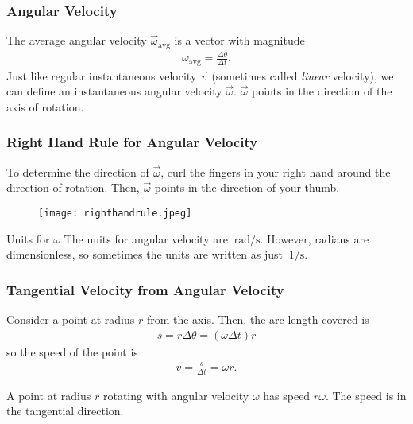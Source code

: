 \documentclass[20pt]{beamer}
\begin{document}
\begin{frame}
	\frametitle{Angular Velocity}
	\begin{definition}
		The average angular velocity $\vec{\omega}_\mathrm{avg}$ is a vector with magnitude
		\begin{align*}
			\omega_\mathrm{avg} = \frac{\Delta \theta}{\Delta t}.
		\end{align*}
		Just like regular instantaneous velocity $\vec{v}$ (sometimes called \textit{linear} velocity), we can define an instantaneous angular velocity $\vec{\omega}$.
		$\vec{\omega}$ points in the direction of the axis of rotation.
	\end{definition}
	\begin{figure}[ht]
		\centering
		\label{fig:angularvel}
	\end{figure}
\end{frame}

\begin{frame}
	\frametitle{Right Hand Rule for Angular Velocity}
	\begin{theorem}
		To determine the direction of $\vec{\omega}$, curl the fingers in your right hand around the direction of rotation. Then, $\vec{\omega}$ points in the direction of your thumb.
	\end{theorem}
	\begin{figure}[ht]
		\centering
		\texttt{[image: righthandrule.jpeg]}
		\label{fig:righthandrule}
	\end{figure}
	\begin{block}{Units for $\omega$}
		The units for angular velocity are $\SI{}{\radian/\second}$. However, radians are dimensionless, so sometimes the units are written as just $\SI{}{1/\second}$.
	\end{block}
\end{frame}

\begin{frame}
	\frametitle{Tangential Velocity from Angular Velocity}
	\begin{figure}[ht]
		\centering
		\label{fig:tangentialvel}
	\end{figure}
	\begin{example}
		Consider a point at radius $r$ from the axis. Then, the arc length covered is
		\begin{align*}
			s = r \Delta \theta = (\omega \Delta t) r
		\end{align*}
		so the speed of the point is
		\begin{align*}
			v = \frac{s}{\Delta t} = \omega r.
		\end{align*}
	\end{example}
	\begin{theorem}
		A point at radius $r$ rotating with angular velocity $\omega$ has speed $r \omega$. The speed is in the tangential direction.
	\end{theorem}
\end{frame}
\end{document}
